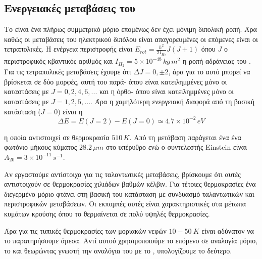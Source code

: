 \documentclass[a4paper,12pt]{memoir}
\begin{document}
\subsection{Ενεργειακές μεταβάσεις του }
Το  είναι ένα πλήρως συμμετρικό μόριο επομένως δεν έχει μόνιμη διπολική ροπή. Άρα καθώς οι μεταβάσεις του ηλεκτρικού διπόλου είναι απαγορευμένες οι επόμενες είναι οι τετραπολικές. 
Η ενέργεια περιστροφής είναι $E_{rot}=\frac{h^2}{2I_{H_2}}J(J+1)$ όπου $J$ ο περιστροφικός κβαντικός αριθμός και $I_{H_2}=5\times 10^{-48} \, kg\, m^2$ η ροπή αδράνειας του .
Για τις τετραπολικές μεταβάσεις έχουμε ότι $\Delta J =0,\pm 2$, άρα για το  αυτό μπορεί να βρίσκεται σε δύο μορφές, αυτή του παρά- όπου είναι κατειλημμένες μόνο οι καταστάσεις με $J=0,2,4,6,...$ και η όρθο- όπου είναι κατειλημμένες μόνο οι καταστάσεις με $J=1,2,5,...$. 
Άρα η χαμηλότερη ενεργειακή διαφορά από τη βασική κατάσταση ($J=0$) είναι η 
\begin{equation}
\Delta E=E(J=2)-E(J=0)\simeq 4.7\times 10^{-2}\, eV
\end{equation}

η οποία αντιστοιχεί σε θερμοκρασία $510 \,K$. Από τη μετάβαση παράγεται ένα ένα φωτόνιο μήκους κύματος $28.2\, \mu m$ στο υπέρυθρο ενώ ο συντελεστής Einstein είναι $A_{20}=3\times 10^{-11} \, s^{-1}$.

Αν εργαστούμε αντίστοιχα για τις ταλαντωτικές μεταβάσεις, βρίσκουμε ότι αυτές αντιστοιχούν σε θερμοκρασίες χιλιάδων βαθμών κέλβιν. Για τέτοιες θερμοκρασίες ένα διεγερμένο μόριο  φτάνει στη βασική του κατάσταση με συνδυασμό ταλαντωτικών και περιστροφικών μεταβάσεων. Οι εκπομπές αυτές είναι χαρακτηριστικές στα μέτωπα κυμάτων κρούσης όπου το  θερμαίνεται σε πολύ υψηλές θερμοκρασίες.

Άρα για τις τυπικές θερμοκρασίες των μοριακών νεφών $10-50\ K$ είναι αδύνατον να το παρατηρήσουμε άμεσα. Αντί αυτού χρησιμοποιούμε το επόμενο σε αναλογία μόριο, το  και θεωρώντας γνωστή την αναλόγια του με το , υπολογίζουμε το δεύτερο. 
\end{document}
